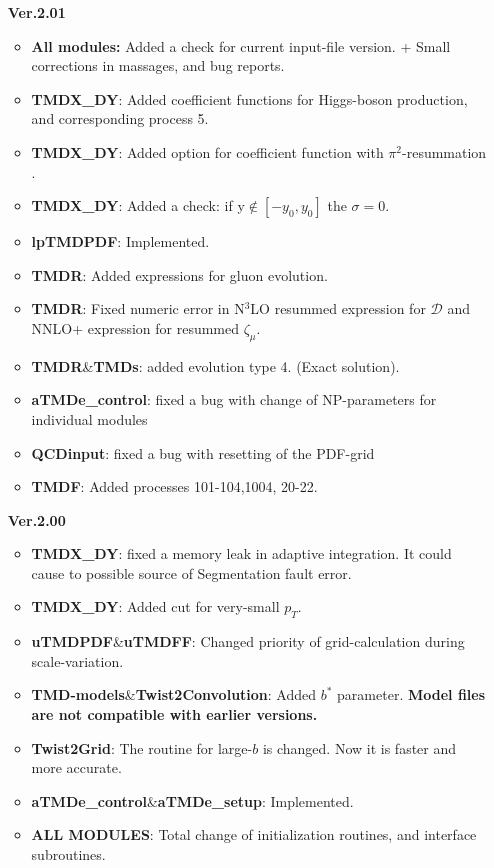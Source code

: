 \documentclass[prd,nofootinbib,eqsecnum,final]{revtex4}
\renewcommand{\(}{\left(}
\renewcommand{\)}{\right)}
\renewcommand{\[}{\left[}
\renewcommand{\]}{\right]}
\newcommand{\red}[1]{{\color[rgb]{1,0,0} #1}}
\begin{document}
\begin{itemize}
\item[\textbf{Ver.2.01}]
\begin{itemize}
	\item \textbf{All modules:} Added a check for current input-file version. + Small corrections in massages, and bug reports.
	\item \textbf{TMDX\_DY}: Added coefficient functions for Higgs-boson production, and corresponding process 5.
	\item \textbf{TMDX\_DY}: Added option for coefficient function with $\pi^2$-resummation \cite{Ahrens:2008qu}.
	\item \textbf{TMDX\_DY}: Added a check: if y$\not\in[-y_0,y_0]$ the $\sigma=0$.
	\item \textbf{lpTMDPDF}: Implemented.
	\item \textbf{TMDR}: Added expressions for gluon evolution. 
	\item \textbf{TMDR}: Fixed numeric error in N$^3$LO resummed expression for $\mathcal{D}$ and NNLO+ expression for resummed $\zeta_\mu$.
	\item \textbf{TMDR}\&\textbf{TMDs}: added evolution type 4. (Exact solution).
	\item \textbf{aTMDe\_control}: fixed a bug with change of NP-parameters for individual modules
	\item \textbf{QCDinput}: fixed a bug with resetting of the PDF-grid
	\item \textbf{TMDF}: Added processes 101-104,1004, 20-22.
\end{itemize}

\item[\textbf{Ver.2.00}]
\begin{itemize}
	\item \textbf{TMDX\_DY}: fixed a memory leak in adaptive integration. It could cause to possible source of Segmentation fault error.
	\item \textbf{TMDX\_DY}: Added cut for very-small $p_T$.
	\item \textbf{uTMDPDF}\&\textbf{uTMDFF}: Changed priority of grid-calculation during scale-variation.
	\item \textbf{TMD-models}\&\textbf{Twist2Convolution}: Added $b^*$ parameter. \textbf{Model files are not compatible with earlier versions.}
	\item \textbf{Twist2Grid}: The routine for large-$b$ is changed. Now it is faster and more accurate.
	\item \textbf{aTMDe\_control}\&\textbf{aTMDe\_setup}: Implemented.
	\item \red{\textbf{ALL MODULES}: Total change of initialization routines, and interface subroutines.}
\end{itemize}


\end{itemize}
\end{document}

